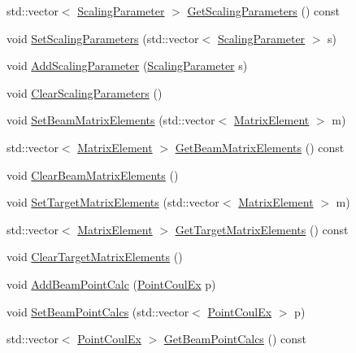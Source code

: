 \begin{DoxyCompactItemize}
std\-::vector$<$ \hyperlink{classScalingParameter}{Scaling\-Parameter} $>$ \hyperlink{classCoulExSimFitter_a32c580e2ffe931a6bfa0e1bea293aca3}{Get\-Scaling\-Parameters} () const 
\item 
void \hyperlink{classCoulExSimFitter_a89e43cd4897b5c56580db7852cbc2d37}{Set\-Scaling\-Parameters} (std\-::vector$<$ \hyperlink{classScalingParameter}{Scaling\-Parameter} $>$ s)
\item 
void \hyperlink{classCoulExSimFitter_a2f5dbaabd2d30726a12ccdbf225261c3}{Add\-Scaling\-Parameter} (\hyperlink{classScalingParameter}{Scaling\-Parameter} s)
\item 
void \hyperlink{classCoulExSimFitter_a84d8c24a786ab8c3201f864190574be5}{Clear\-Scaling\-Parameters} ()
\item 
void \hyperlink{classCoulExSimFitter_a01c682e2e9a1e84d8c3a977fb1d6e1a8}{Set\-Beam\-Matrix\-Elements} (std\-::vector$<$ \hyperlink{classMatrixElement}{Matrix\-Element} $>$ m)
\item 
std\-::vector$<$ \hyperlink{classMatrixElement}{Matrix\-Element} $>$ \hyperlink{classCoulExSimFitter_a0a1e5ccae924c97fdb497c43d62fe609}{Get\-Beam\-Matrix\-Elements} () const 
\item 
void \hyperlink{classCoulExSimFitter_ae4ba8e01614d5f3d50a22abb74dd4e8a}{Clear\-Beam\-Matrix\-Elements} ()
\item 
void \hyperlink{classCoulExSimFitter_a1ecc0eecc268545044e3f73c26eb00a6}{Set\-Target\-Matrix\-Elements} (std\-::vector$<$ \hyperlink{classMatrixElement}{Matrix\-Element} $>$ m)
\item 
std\-::vector$<$ \hyperlink{classMatrixElement}{Matrix\-Element} $>$ \hyperlink{classCoulExSimFitter_ae7dca1a0f23e15d332a4141fd09a2ed3}{Get\-Target\-Matrix\-Elements} () const 
\item 
void \hyperlink{classCoulExSimFitter_a8ecb42674aefdf6dee9779144ec5915e}{Clear\-Target\-Matrix\-Elements} ()
\item 
void \hyperlink{classCoulExSimFitter_a3cd07b08eaf376346bc36be2cab2b0af}{Add\-Beam\-Point\-Calc} (\hyperlink{classPointCoulEx}{Point\-Coul\-Ex} p)
\item 
void \hyperlink{classCoulExSimFitter_a6fd0a37afe00943badaa5dd3aa006265}{Set\-Beam\-Point\-Calcs} (std\-::vector$<$ \hyperlink{classPointCoulEx}{Point\-Coul\-Ex} $>$ p)
\item 
std\-::vector$<$ \hyperlink{classPointCoulEx}{Point\-Coul\-Ex} $>$ \hyperlink{classCoulExSimFitter_a83cf4799996faac7fee012a797d14d68}{Get\-Beam\-Point\-Calcs} () const 
\item 

\end{DoxyCompactItemize}
